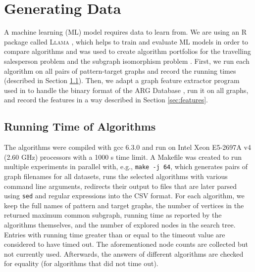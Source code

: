 \documentclass{l4proj}
\theoremstyle{definition}
\theoremstyle{remark}
\begin{document}
\chapter{Generating Data} \label{chapter:generating_data}
A machine learning (ML) model requires data to learn from. We are using an R
package called \textsc{Llama} \cite{kotthoff_llama_2013, llama}, which helps to train
and evaluate ML models in order to compare algorithms and was used to create
algorithm portfolios for the travelling salesperson problem
\cite{DBLP:conf/lion/KotthoffKHT15} and the subgraph isomorphism problem
\cite{DBLP:conf/lion/KotthoffMS16}. First, we run each algorithm on all pairs of
pattern-target graphs and record the running times (described in Section
\ref{sec:runtimes}). Then, we adapt a graph feature extractor program used in
\cite{DBLP:conf/lion/KotthoffMS16} to handle the binary format of the ARG
Database \cite{foggia2001-2, DBLP:journals/prl/SantoFSV03}, run it on all
graphs, and record the features in a way described in Section
\ref{sec:features}.

\section{Running Time of Algorithms} \label{sec:runtimes}

The algorithms were compiled with gcc 6.3.0 and run on Intel Xeon E5-2697A v4
(2.60 GHz) processors with a \num{1000} s time limit. A Makefile was created to
run multiple experiments in parallel with, e.g., \texttt{make -j 64}, which
generates pairs of graph filenames for all datasets, runs the selected
algorithms with various command line arguments, redirects their output to files
that are later parsed using \texttt{sed} and regular expressions into the CSV
format. For each algorithm, we keep the full names of pattern and target graphs,
the number of vertices in the returned maximum common subgraph, running time as
reported by the algorithms themselves, and the number of explored nodes in the
search tree. Entries with running time greater than or equal to the timeout
value are considered to have timed out. The aforementioned node counts are
collected but not currently used. Afterwards, the answers of different
algorithms are checked for equality (for algorithms that did not time out).
\end{document}
